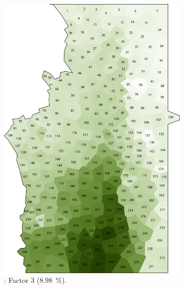 \documentclass[output=paper]{LSP/langsci}
\begin{document}
\begin{figure}
~
\begin{subfigure}[t]{0.3\textwidth}
\includegraphics[width=\textwidth]{illustrations/pickl_fig4}
\caption{: Factor 3 (8.98~\%).}
\label{fig:4}
\end{subfigure}  
~
\begin{subfigure}[t]{0.3\textwidth}

\end{subfigure}
\end{figure}
\end{document}
